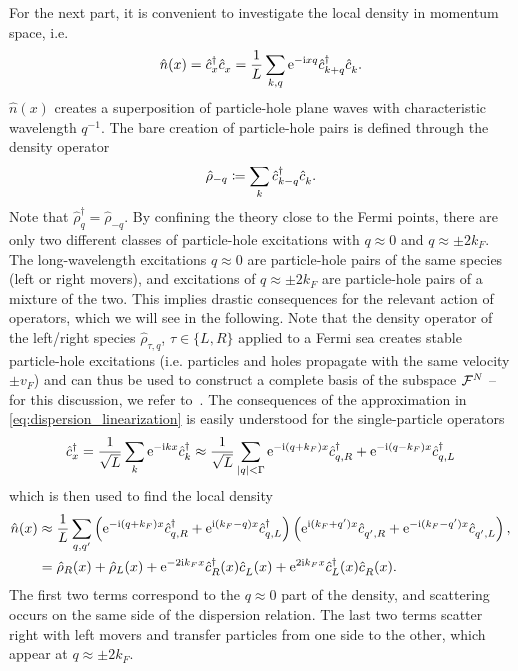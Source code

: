 For the next part, it is convenient to investigate the local density in momentum space, i.e.
\begin{align}
    \hat n(x) = \hat c^\dag_x \hat c^\pdag_x = \frac1L\sum_{k,q}\re^{-\ri x q}\hat c^\dag_{k+q}\hat c^\pdag_{k}.
    \label{eq:local_density}
\end{align}
$\hat n(x)$ creates a superposition of particle-hole plane waves with characteristic wavelength $q^{-1}$.
The bare creation of particle-hole pairs is defined through the density operator
\begin{align}
    \hat \rho_{-q}\coloneqq \sum_k \hat c^\dag_{k-q}\hat c^\pdag_{k}.
\end{align}
Note that $\hat\rho_q^\dag = \hat\rho_{-q}$.
By confining the theory close to the Fermi points, there are only two different classes of particle-hole excitations with $q\approx 0$ and $q\approx\pm2k_F$.
The long-wavelength excitations $q\approx0$ are particle-hole pairs of the same species (left or right movers), and excitations of $q\approx\pm2k_F$ are particle-hole pairs of a mixture of the two.
This implies drastic consequences for the relevant action of operators, which we will see in the following.
Note that the density operator of the left/right species $\hat\rho_{\tau,q}$, $\tau\in\{L,R\}$ applied to a Fermi sea creates stable particle-hole excitations (i.e. particles and holes propagate with the same velocity $\pm v_F$) and can thus be used to construct a complete basis of the subspace $\mathcal{F}^N$ -- for this discussion, we refer to~\cite{vonDelft1998}.
The consequences of the approximation in \cref{eq:dispersion_linearization} is easily understood for the single-particle operators
\begin{align}
    \hat c^\dag_x = \frac1{\sqrt L}\sum_k \mathrm e^{-\mathrm i k x}\hat c^\dag_k \approx \frac1{\sqrt L}\sum_{|q|<\Gamma}\mathrm e^{-\mathrm i (q+k_F) x}\hat c^\dag_{q,R} + \mathrm e^{-\mathrm i (q-k_F) x}\hat c^\dag_{q,L}
    \label{eq:confinement_creation_annihilation}
\end{align}
which is then used to find the local density
\begin{align}
    \hat n(x)
    &\approx \frac1L\sum_{q,q'}\brlr{\re^{-\ri (q+k_F) x}\hat c^\dag_{q,R} + \re^{\ri (k_F-q) x}\hat c^\dag_{q,L}}\brlr{\re^{\ri (k_F+q') x}\hat c^\pdag_{q',R} + \re^{-\ri (k_F-q') x}\hat c^\pdag_{q',L}},
    \\
    &= \hat \rho_R(x) + \hat \rho_L(x) + \re^{-2\ri k_Fx}\hat c^\dag_{R}(x)\hat c^\pdag_{L}(x) + \re^{2\ri k_Fx}\hat c^\dag_{L}(x)\hat c^\pdag_{R}(x).
    \label{eq:local_density_approximation}
\end{align}
The first two terms correspond to the $q\approx0$ part of the density, and scattering occurs on the same side of the dispersion relation.
The last two terms scatter right with left movers and transfer particles from one side to the other, which appear at $q\approx\pm2k_F$.

